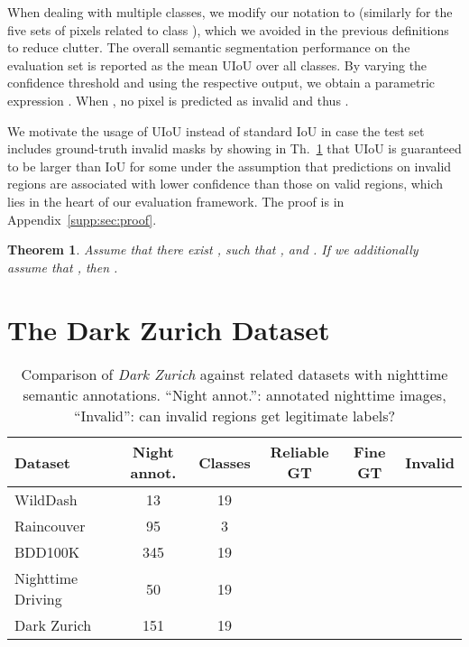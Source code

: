 \documentclass[10pt,twocolumn,letterpaper]{article}
\newtheorem{thm}{Theorem}
\newcommand{\yes}{\checkmark}
\newcommand{\no}{}
\begin{document}
When dealing with multiple classes, we modify our notation to  (similarly for the five sets of pixels related to class ), which we avoided in the previous definitions to reduce clutter. The overall semantic segmentation performance on the evaluation set is reported as the mean UIoU over all  classes. By varying the confidence threshold  and using the respective output, we obtain a parametric expression . When , no pixel is predicted as invalid and thus .

We motivate the usage of UIoU instead of standard IoU in case the test set includes ground-truth invalid masks by showing in Th.~\ref{thm:UIoU:greater:iou} that UIoU is guaranteed to be larger than IoU for some  under the assumption that predictions on invalid regions are associated with lower confidence than those on valid regions, which lies in the heart of our evaluation framework. The proof is in Appendix~\ref{supp:sec:proof}.

\begin{thm} \label{thm:UIoU:greater:iou}
Assume that there exist ,  such that ,  and . If we additionally assume that , then .
\end{thm}


\section{The Dark Zurich Dataset}
\label{sec:dark:zurich}

\begin{table}[!tb]
    \caption{Comparison of \emph{Dark Zurich} against related datasets with nighttime semantic annotations. ``Night annot.'': annotated nighttime images, ``Invalid'': can invalid regions get legitimate labels?}
    \label{table:datasets:comparison}
    \centering
    \footnotesize
    \setlength\tabcolsep{1.2pt}
    \begin{tabular}{lccccc}
    \toprule
    Dataset & Night annot. & Classes & Reliable GT & Fine GT & Invalid \\
    \midrule
    WildDash~\cite{wilddash} & 13 & 19 & \yes & \yes & \no \\
    Raincouver~\cite{raincouver} & 95 & 3 & \yes & \no & \no \\
    BDD100K~\cite{BDD100K} & 345 & 19 & \no & \yes & \no \\
    Nighttime Driving~\cite{daytime:2:nighttime} & 50 & 19 & \yes & \no & \no \\
    Dark Zurich & 151 & 19 & \yes & \yes & \yes \\
    \bottomrule
    \end{tabular}
\end{table}
\end{document}
